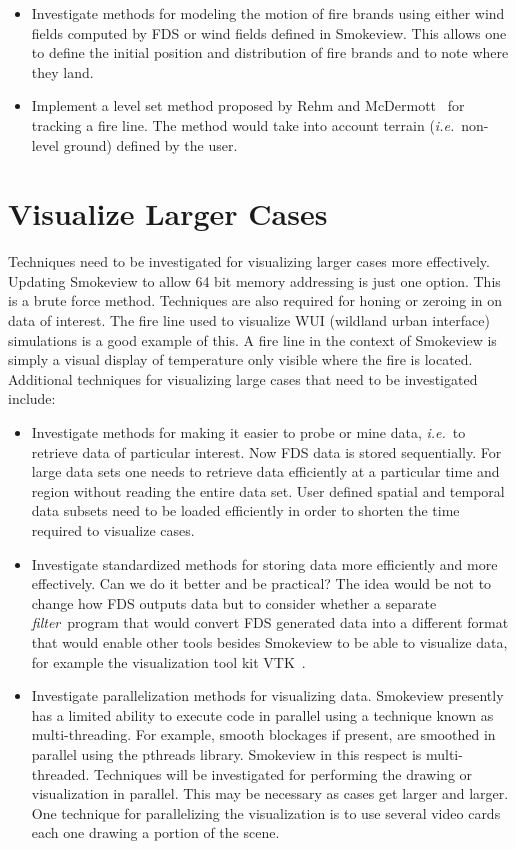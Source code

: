 \documentclass[11pt,twoside]{book}
\begin{document}
\begin{itemize}
\item  Investigate methods for modeling the motion of fire brands using either wind fields computed by FDS or wind fields defined in Smokeview.
This allows one to define the initial position and distribution of fire brands and to note where they land.
\item Implement a level set method proposed by Rehm and McDermott~\cite{Rehm:LevelSet} for tracking a fire line.  The method would take into account terrain ({\em i.e.}\ non-level ground) defined by the user.
\end{itemize}

\section{Visualize Larger Cases}
Techniques need to be investigated for visualizing larger cases more effectively.  Updating Smokeview to allow 64 bit memory addressing is just one option.  This is a brute force method.  Techniques are also required for honing or zeroing in on data of interest.  The fire line used to visualize WUI (wildland urban interface) simulations is a good example of this.  A fire line in the context of Smokeview is simply a visual display of temperature only visible where the fire is located.  Additional techniques for visualizing large cases that need to be investigated include:

\begin{itemize}
\item Investigate methods for making it easier to probe or mine data, {\em i.e.}\ to retrieve data of particular interest.  Now FDS data is stored sequentially.  For large data sets one needs to retrieve data efficiently at a particular time and region without reading the entire data set.
    User defined spatial and temporal data subsets need to be loaded efficiently in order to shorten the time required to visualize cases.

\item Investigate standardized methods for storing data more efficiently and more effectively.  Can we do it better and be practical?  The idea would be not to change how FDS outputs data but to consider whether a separate {\em filter}\ program that would convert FDS generated data into a different format that would enable other tools besides Smokeview to be able to visualize data, for example the visualization tool kit VTK~\cite{VTK}.

\item Investigate parallelization methods for visualizing data.  Smokeview presently has a limited ability to execute code in parallel using a technique known as multi-threading.    For example, smooth blockages if present, are smoothed in parallel using the pthreads library. Smokeview in this respect is multi-threaded.  Techniques will be investigated for performing the drawing or visualization in parallel.  This may be necessary as cases get larger and larger.  One technique for parallelizing the visualization is to use several video cards each one drawing a portion of the scene.
\end{itemize}
\end{document}

